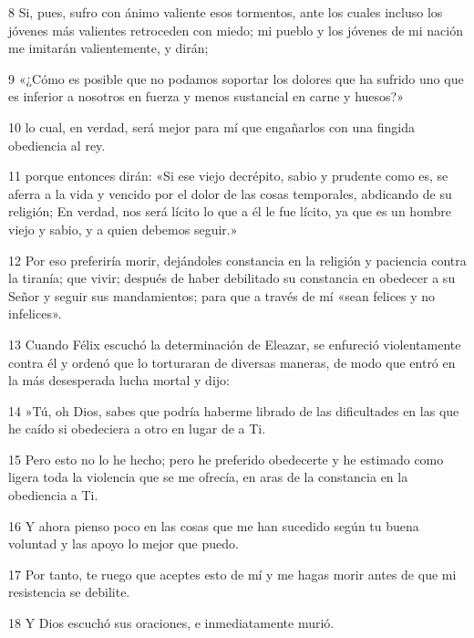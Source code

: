 \par 8 Si, pues, sufro con ánimo valiente esos tormentos, ante los cuales incluso los jóvenes más valientes retroceden con miedo; mi pueblo y los jóvenes de mi nación me imitarán valientemente, y dirán;

\par 9 «¿Cómo es posible que no podamos soportar los dolores que ha sufrido uno que es inferior a nosotros en fuerza y ​​menos sustancial en carne y huesos?»

\par 10 lo cual, en verdad, será mejor para mí que engañarlos con una fingida obediencia al rey.

\par 11 porque entonces dirán: «Si ese viejo decrépito, sabio y prudente como es, se aferra a la vida y vencido por el dolor de las cosas temporales, abdicando de su religión; En verdad, nos será lícito lo que a él le fue lícito, ya que es un hombre viejo y sabio, y a quien debemos seguir.»

\par 12 Por eso preferiría morir, dejándoles constancia en la religión y paciencia contra la tiranía; que vivir; después de haber debilitado su constancia en obedecer a su Señor y seguir sus mandamientos; para que a través de mí «sean felices y no infelices».

\par 13 Cuando Félix escuchó la determinación de Eleazar, se enfureció violentamente contra él y ordenó que lo torturaran de diversas maneras, de modo que entró en la más desesperada lucha mortal y dijo:

\par 14 »Tú, oh Dios, sabes que podría haberme librado de las dificultades en las que he caído si obedeciera a otro en lugar de a Ti.

\par 15 Pero esto no lo he hecho; pero he preferido obedecerte y he estimado como ligera toda la violencia que se me ofrecía, en aras de la constancia en la obediencia a Ti.

\par 16 Y ahora pienso poco en las cosas que me han sucedido según tu buena voluntad y las apoyo lo mejor que puedo.

\par 17 Por tanto, te ruego que aceptes esto de mí y me hagas morir antes de que mi resistencia se debilite.

\par 18 Y Dios escuchó sus oraciones, e inmediatamente murió.

